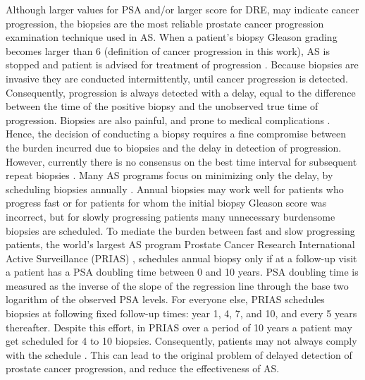 Although larger values for PSA and/or larger score for DRE, may indicate cancer progression, the biopsies are the most reliable prostate cancer progression examination technique used in AS. When a patient's biopsy Gleason grading becomes larger than 6 (definition of cancer progression in this work), AS is stopped and patient is advised for treatment of progression \cite{bokhorst2015compliance}. Because biopsies are invasive they are conducted intermittently, until cancer progression is detected. Consequently, progression is always detected with a delay, equal to the difference between the time of the positive biopsy and the unobserved true time of progression. Biopsies are also painful, and prone to medical complications \cite{ehdaie2014impact}. Hence, the decision of conducting a biopsy requires a fine compromise between the burden incurred due to biopsies and the delay in detection of progression. However, currently there is no consensus on the best time interval for subsequent repeat biopsies \cite{loeb2014heterogeneity}. Many AS programs focus on minimizing only the delay, by scheduling biopsies annually \cite{welty2015extended}. Annual biopsies may work well for patients who progress fast or for patients for whom the initial biopsy Gleason score was incorrect, but for slowly progressing patients many unnecessary burdensome biopsies are scheduled. To mediate the burden between fast and slow progressing patients, the world's largest AS program Prostate Cancer Research International Active Surveillance (PRIAS) \cite{bul2013active}, schedules annual biopsy only if at a follow-up visit a patient has a PSA doubling time between 0 and 10 years. PSA doubling time is measured as the inverse of the slope of the regression line through the base two logarithm of the observed PSA levels. For everyone else, PRIAS schedules biopsies at following fixed follow-up times: year 1, 4, 7, and 10, and every 5 years thereafter. Despite this effort, in PRIAS over a period of 10 years a patient may get scheduled for 4 to 10 biopsies. Consequently, patients may not always comply with the schedule \cite{bokhorst2015compliance}. This can lead to the original problem of delayed detection of prostate cancer progression, and reduce the effectiveness of AS.

